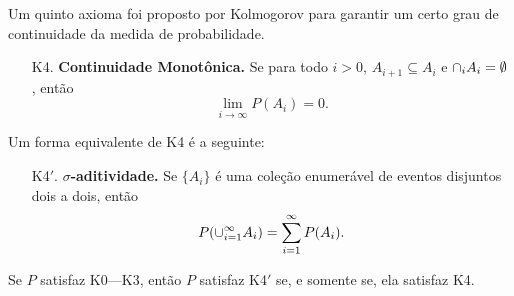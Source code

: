 \begin{frame}

Um quinto axioma foi proposto por Kolmogorov para garantir um certo grau de
continuidade da medida de probabilidade.

\begin{enumerate}
	\item[K4.] {\bf Continuidade Monotônica.} Se para todo $i>0$,  $A_{i+1}\subseteq A_i$ e $\cap_i A_i=\emptyset$,
	então
	$$\lim_{i\rightarrow\infty}P(A_i)=0.
	$$
\end{enumerate}
Um forma equivalente de K4 é a seguinte:

\begin{enumerate}
\item[K4$'$.] {\bf $\sigma$-aditividade.} Se $\{A_i\}$ é uma coleção enumerável de eventos disjuntos dois a dois, então
$$P(\cup_{i=1}^{\infty}A_i)=\sum_{i=1}^{\infty} P(A_i).$$
\end{enumerate}

\begin{teo} Se $P$ satisfaz K0---K3, então $P$ satisfaz K4$'$ se, e somente
se, ela satisfaz K4.
\end{teo}

\end{frame}

